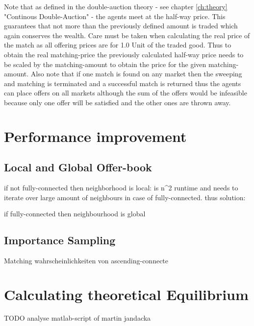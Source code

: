 \documentclass[Bachelorarbeit.tex]{subfiles}
\begin{document}
Note that as defined in the double-auction theory - see chapter \ref{ch:theory} "Continous Double-Auction" - the agents meet at the half-way price. This guarantees that not more than the previously defined amount is traded which again conserves the wealth. Care must be taken when calculating the real price of the match as all offering prices are for 1.0 Unit of the traded good. Thus to obtain the real matching-price the previously calculated half-way price needs to be scaled by the matching-amount to obtain the price for the given matching-amount.
\medskip
Also note that if one match is found on any market then the sweeping and matching is terminated and a successful match is returned thus the agents can place offers on all markets although the sum of the offers would be infeasible because only one offer will be satisfied and the other ones are thrown away.

\section{Performance improvement}
\label{sec:implementation_performanceImprovement}

\subsection{Local and Global Offer-book}
if not fully-connected then neighborhood is local: is n^2 runtime and needs to iterate over large amount of neighbours in case of fully-connected. thus solution:

if fully-connected then neighbourhood is global

\subsection{Importance Sampling}
Matching wahrscheinlichkeiten von ascending-connecte

\section{Calculating theoretical Equilibrium}
TODO analyse matlab-script of martin jandacka
\end{document}
